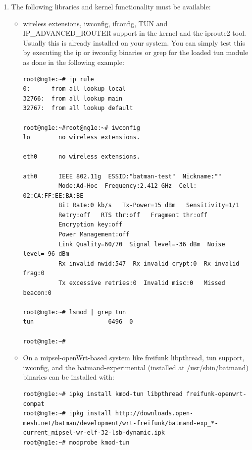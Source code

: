 \documentclass[11pt]{article}
\begin{document}
\begin{enumerate}

\item The following libraries and kernel functionality must be available:

\begin{itemize}
 \item wireless extensions, iwconfig, ifconfig, TUN and IP\_ADVANCED\_ROUTER support in the kernel and the iproute2 tool. Usually this is already installed on your system. You can simply test this by executing the ip or iwconfig binaries or grep for the loaded tun module as done in the following example:
%
\begin{small} \begin{verbatim}
root@ng1e:~# ip rule
0:      from all lookup local
32766:  from all lookup main
32767:  from all lookup default

root@ng1e:~#root@ng1e:~# iwconfig
lo        no wireless extensions.

eth0      no wireless extensions.

ath0      IEEE 802.11g  ESSID:"batman-test"  Nickname:""
          Mode:Ad-Hoc  Frequency:2.412 GHz  Cell: 02:CA:FF:EE:BA:BE
          Bit Rate:0 kb/s   Tx-Power=15 dBm   Sensitivity=1/1
          Retry:off   RTS thr:off   Fragment thr:off
          Encryption key:off
          Power Management:off
          Link Quality=60/70  Signal level=-36 dBm  Noise level=-96 dBm
          Rx invalid nwid:547  Rx invalid crypt:0  Rx invalid frag:0
          Tx excessive retries:0  Invalid misc:0   Missed beacon:0

root@ng1e:~# lsmod | grep tun
tun                     6496  0

root@ng1e:~#
\end{verbatim} \end{small}

\item On a mipsel-openWrt-based system like freifunk libpthread, tun support, iwconfig, and the batmand-experimental (installed at /usr/sbin/batmand) binaries can be installed with:
%
\begin{tiny}  \begin{verbatim}
root@ng1e:~# ipkg install kmod-tun libpthread freifunk-openwrt-compat
root@ng1e:~# ipkg install http://downloads.open-mesh.net/batman/development/wrt-freifunk/batmand-exp_*-current_mipsel-wr-elf-32-lsb-dynamic.ipk
root@ng1e:~# modprobe kmod-tun
\end{verbatim} \end{tiny}


\end{itemize}
\end{enumerate}
\end{document}
